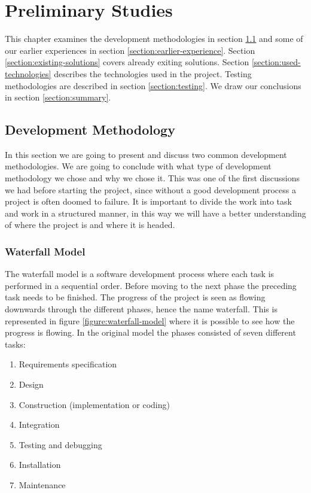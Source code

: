 \chapter{Preliminary Studies}
\label{Preliminary Studies}

This chapter examines the development methodologies in section \ref{section:development-methodology}
and some of our earlier experiences in section \ref{section:earlier-experience}.
Section \ref{section:existing-solutions} covers already exiting solutions.
Section \ref{section:used-technologies} describes the technologies used in the project.
Testing methodologies are described in section \ref{section:testing}.
We draw our conclusions in section \ref{section:summary}.


\section{Development Methodology}
\label{section:development-methodology}

In this section we are going to present and discuss two common development methodologies.
We are going to conclude with what type of development methodology we chose and why we chose it.
This was one of the first discussions we had before starting the project, since without a good development process a project is often doomed to failure.
It is important to divide the work into task and work in a structured manner, in this way we will have a better understanding of where the project is and where it is headed.

\subsection{Waterfall Model} \nocite{WaterfallModel}

The waterfall model is a software development process where each task is performed in a sequential order.
Before moving to the next phase the preceding task needs to be finished.
The progress of the project is seen as flowing downwards through the different phases, hence the name waterfall.
This is represented in figure \ref{figure:waterfall-model} where it is possible to see how the progress is flowing.
In the original model the phases consisted of seven different tasks:

\begin{enumerate}
\item Requirements specification
\item Design
\item Construction (implementation or coding)
\item Integration
\item Testing and debugging
\item Installation
\item Maintenance
\end{enumerate}


